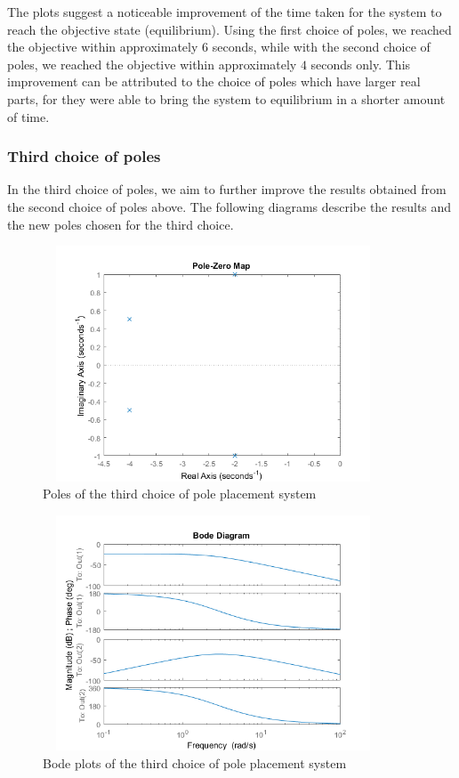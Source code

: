 \documentclass [12pt,letterpaper]{exam}
\begin{document}


The plots suggest a noticeable improvement of the time taken for the system to reach the objective state (equilibrium). Using the first choice of poles, we reached the objective within approximately $6$ seconds, while with the second choice of poles, we reached the objective within approximately $4$ seconds only. This improvement can be attributed to the choice of poles which have larger real parts, for they were able to bring the system to equilibrium in a shorter amount of time.

\subsubsection{Third choice of poles}
In the third choice of poles, we aim to further improve the results obtained from the second choice of poles above. The following diagrams describe the results and the new poles chosen for the third choice.

\begin{figure}[H]
  \centering
    \includegraphics[width=10.15cm, height=7cm]{pl3_poles} 
  \caption{Poles of the third choice of pole placement system}
  \label{fig:pl3_poles}
\end{figure}

\begin{figure}[H]
  \centering
    \includegraphics[width=10.15cm, height=7cm]{pl3_bode} 
  \caption{Bode plots of the third choice of pole placement system}
  \label{fig:pl3_bode}
\end{figure}
\end{document}
